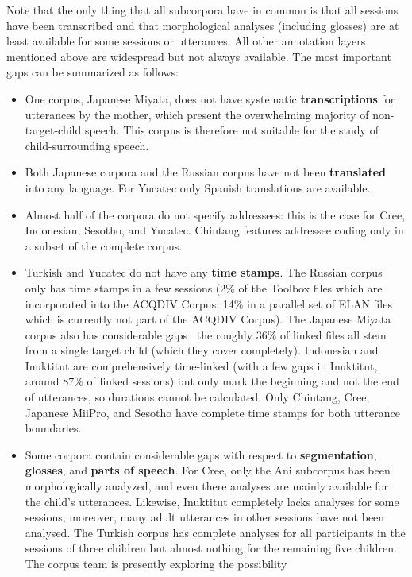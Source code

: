 \documentclass[a4paper, 11pt]{book}
\begin{document}
Note that the only thing that all subcorpora have in common is that all sessions have been transcribed and that morphological analyses (including glosses) are at least available for some sessions or utterances. All other annotation layers mentioned above are widespread but not always available. The most important gaps can be summarized as follows:

\begin{itemize}
	\item One corpus, Japanese Miyata, does not have systematic \textbf{transcriptions} for utterances by the mother, which present the overwhelming
		majority of non-target-child speech. This corpus is therefore not suitable for the study of child-surrounding speech. 
	\item Both Japanese corpora and the Russian corpus have not been \textbf{translated} into any language. For Yucatec only Spanish translations are available. 
	\item Almost half of the corpora do not specify addressees: this is the case for Cree, Indonesian, Sesotho, and Yucatec. Chintang features addressee coding
		only in a subset of the complete corpus. 
	\item Turkish and Yucatec do not have any \textbf{time stamps}. The Russian corpus only has time stamps in a few sessions (2\% of the Toolbox files which are incorporated
		into the ACQDIV Corpus; 14\% in a parallel set of ELAN files which is currently not part of the ACQDIV Corpus). The Japanese Miyata corpus also has considerable gaps
		\textendash\ the roughly 36\% of linked files all stem from a single target child (which they cover completely). Indonesian and Inuktitut 
		are comprehensively time-linked (with a few gaps in Inuktitut, around 87\% of linked sessions) but only mark the beginning and not the 
		end of utterances, so durations cannot be calculated. Only Chintang, Cree, Japanese MiiPro, and Sesotho have complete time stamps 
		for both utterance boundaries. 
	\item Some corpora contain considerable gaps with respect to \textbf{segmentation}, \textbf{glosses}, and \textbf{parts of speech}. For Cree, only the Ani subcorpus 
		has been morphologically analyzed, and even there analyses are mainly available for the child’s utterances. Likewise, Inuktitut completely lacks analyses for
		some sessions; moreover, many adult utterances in other sessions have not been analysed. The Turkish corpus has complete analyses for all participants 
		in the sessions of three children but almost nothing for the remaining five children. The corpus team is presently exploring the possibility

\end{itemize}
\end{document}
